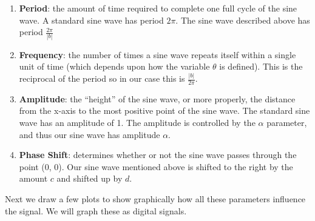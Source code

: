 \documentclass[]{krantz}
\providecommand{\tightlist}{%
  \setlength{\itemsep}{0pt}\setlength{\parskip}{0pt}}
\begin{document}
\begin{enumerate}
\def\labelenumi{\arabic{enumi}.}
\tightlist
\item
  \textbf{Period}: the amount of time required to complete one full
  cycle of the sine wave. A standard sine wave has period \(2\pi\). The
  sine wave described above has period \(\frac{2\pi}{|b|}\)
\item
  \textbf{Frequency}: the number of times a sine wave repeats itself
  within a single unit of time (which depends upon how the variable
  \(\theta\) is defined). This is the reciprocal of the period so in our
  case this is \(\frac{|b|}{2\pi}\).
\item
  \textbf{Amplitude}: the ``height'' of the sine wave, or more properly,
  the distance from the x-axis to the most positive point of the sine
  wave. The standard sine wave has an amplitude of 1. The amplitude is
  controlled by the \(\alpha\) parameter, and thus our sine wave has
  amplitude \(\alpha\).
\item
  \textbf{Phase Shift}: determines whether or not the sine wave passes
  through the point (0, 0). Our sine wave mentioned above is shifted to
  the right by the amount \(c\) and shifted up by \(d\).
\end{enumerate}

Next we draw a few plots to show graphically how all these parameters
influence the signal. We will graph these as digital signals.
\end{document}
